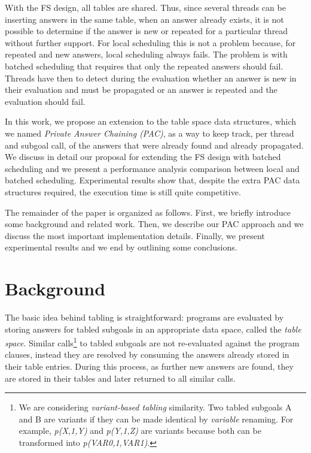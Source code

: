 \documentclass{llncs}
\begin{document}
With the FS design, all tables are shared. Thus, since several threads
can be inserting answers in the same table, when an answer already
exists, it is not possible to determine if the answer is new or
repeated for a particular thread without further support. For local
scheduling this is not a problem because, for repeated and new
answers, local scheduling always fails. The problem is with batched
scheduling that requires that only the repeated answers should
fail. Threads have then to detect during the evaluation whether an
answer is new in their evaluation and must be propagated or an answer
is repeated and the evaluation should fail.
 
In this work, we propose an extension to the table space data
structures, which we named \emph{Private Answer Chaining (PAC)}, as a
way to keep track, per thread and subgoal call, of the answers that
were already found and already propagated. We discuss in detail our
proposal for extending the FS design with batched scheduling and we
present a performance analysis comparison between local and batched
scheduling. Experimental results show that, despite the extra PAC data
structures required, the execution time is still quite competitive.

The remainder of the paper is organized as follows. First, we briefly
introduce some background and related work. Then, we describe our PAC
approach and we discuss the most important implementation
details. Finally, we present experimental results and we end by
outlining some conclusions.


\section{Background}

The basic idea behind tabling is straightforward: programs are
evaluated by storing answers for tabled subgoals in an appropriate
data space, called the \emph{table space}. Similar calls\footnote{We
  are considering \emph{variant-based tabling} similarity. Two tabled
  subgoals A and B are variants if they can be made identical by
  \emph{variable} renaming. For example, \emph{p(X,1,Y)} and
  \emph{p(Y,1,Z)} are variants because both can be transformed into
  \emph{p(VAR0,1,VAR1)}.} to tabled subgoals are not re-evaluated
against the program clauses, instead they are resolved by consuming
the answers already stored in their table entries. During this
process, as further new answers are found, they are stored in their
tables and later returned to all similar calls.
\end{document}

